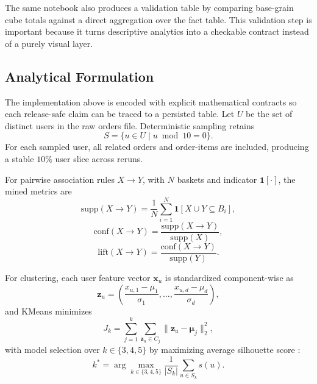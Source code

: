 \documentclass[journal]{IEEEtran}
\begin{document}
The same notebook also produces a validation table by comparing base-grain cube totals against a direct aggregation over the fact table. This validation step is important because it turns descriptive analytics into a checkable contract instead of a purely visual layer.

\subsection{Analytical Formulation}
The implementation above is encoded with explicit mathematical contracts so each release-safe claim can be traced to a persisted table. Let \(U\) be the set of distinct users in the raw orders file. Deterministic sampling retains
\begin{equation}
S = \{u \in U \mid u \bmod 10 = 0\}.
\end{equation}
For each sampled user, all related orders and order-items are included, producing a stable \(10\%\) user slice across reruns.

For pairwise association rules \(X \rightarrow Y\), with \(N\) baskets and indicator \(\mathbf{1}[\cdot]\), the mined metrics are
\begin{equation}
\mathrm{supp}(X \rightarrow Y) = \frac{1}{N}\sum_{i=1}^{N}\mathbf{1}[X \cup Y \subseteq B_i],
\end{equation}
\begin{equation}
\mathrm{conf}(X \rightarrow Y) = \frac{\mathrm{supp}(X \rightarrow Y)}{\mathrm{supp}(X)},
\end{equation}
\begin{equation}
\mathrm{lift}(X \rightarrow Y) = \frac{\mathrm{conf}(X \rightarrow Y)}{\mathrm{supp}(Y)}.
\end{equation}

For clustering, each user feature vector \(\mathbf{x}_u\) is standardized component-wise as
\begin{equation}
\mathbf{z}_u = \left(\frac{x_{u,1}-\mu_1}{\sigma_1},\ldots,\frac{x_{u,d}-\mu_d}{\sigma_d}\right),
\end{equation}
and KMeans minimizes
\begin{equation}
J_k = \sum_{j=1}^{k}\sum_{\mathbf{z}_u \in C_j}\lVert\mathbf{z}_u-\boldsymbol{\mu}_j\rVert_2^2,
\end{equation}
with model selection over \(k \in \{3,4,5\}\) by maximizing average silhouette score \cite{rouseeuw1987silhouettes}:
\begin{equation}
k^* = \arg\max_{k \in \{3,4,5\}}\frac{1}{|S_k|}\sum_{u \in S_k}s(u).
\end{equation}
\end{document}
